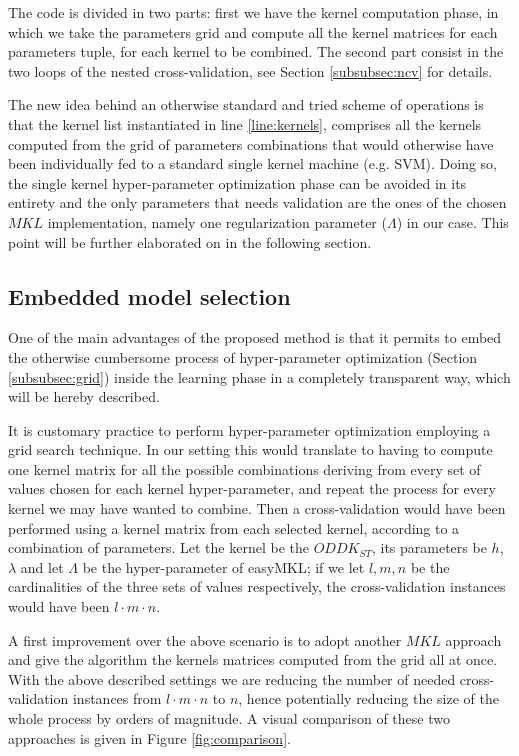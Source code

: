 The code is divided in two parts: first we have the kernel computation phase,
in which we take the parameters grid and compute all the kernel matrices for each
parameters tuple, for each kernel to be combined.
The second part consist in the two loops of the nested cross-validation, see
Section \ref{subsubsec:ncv} for details.

The new idea behind an otherwise standard and tried scheme of operations is that
the kernel list instantiated in line \ref{line:kernels}, comprises all the 
kernels computed from the grid of parameters combinations that would otherwise
have been individually fed to a standard single kernel machine (e.g. SVM).
Doing so, the single kernel hyper-parameter optimization phase can be avoided in its
entirety and the only parameters that needs validation are the ones of the chosen
$MKL$ implementation, namely one regularization parameter ($\Lambda$) in our case.
This point will be further elaborated on in the following section.

\subsection{Embedded model selection}
\label{subsec:parameters}
One of the main advantages of the proposed method is that it permits to embed
the otherwise cumbersome process of hyper-parameter optimization (Section \ref{subsubsec:grid})
inside the learning phase in a completely transparent way, which will be hereby
described.

It is customary practice to perform hyper-parameter optimization employing a grid
search technique.
In our setting this would translate to having to compute one kernel matrix
for all the possible combinations deriving from every set of values
chosen for each kernel hyper-parameter, and repeat the process for every kernel
we may have wanted to combine.
Then a cross-validation would have been performed using a kernel matrix from each
selected kernel, according to a combination of parameters.
Let the kernel be the $ODDK_{ST}$, its parameters be $h$, $\lambda$ and let $\Lambda$
be the hyper-parameter of easyMKL; if we let $l,m,n$ be the cardinalities of the three
sets of values respectively, the cross-validation instances would have been $l\cdot m\cdot n$.

A first improvement over the above scenario is to adopt another $MKL$ approach 
and give the algorithm the kernels matrices computed from the grid all at once.
With the above described settings we are reducing the number of needed
cross-validation instances from $l\cdot m\cdot n$ to $n$, hence potentially
reducing the size of the whole process by orders of magnitude.
A visual comparison of these two approaches is given in Figure \ref{fig:comparison}.

